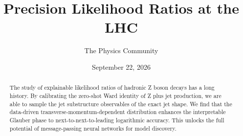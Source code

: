 \documentclass[11pt]{article}
\title{Precision Likelihood Ratios at the LHC}
\author{The Physics Community}
\date{September 22, 2026}
\numberwithin{equation}{section}
\theoremstyle{definition}
\theoremstyle{remark}
\begin{document}
\maketitle
\begin{abstract}
The study of explainable likelihood ratios of hadronic Z boson decays
has a long history. By calibrating the zero-shot Ward identity of Z plus
jet production, we are able to sample the jet substructure observables
of the exact jet shape. We find that the data-driven
transverse-momentum-dependent distribution enhances the interpretable
Glauber phase to next-to-next-to-leading logarithmic accuracy. This
unlocks the full potential of message-passing neural networks for model
discovery.
\end{abstract}
\tableofcontents






\nocite{*}


\end{document}
